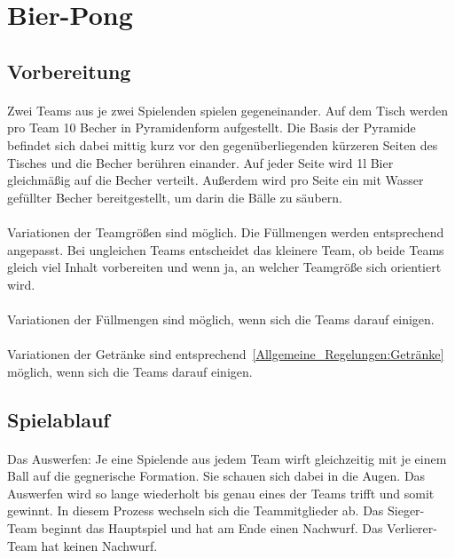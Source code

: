 \section{Bier-Pong}
\subsection{Vorbereitung}
\paragraph{}
Zwei Teams aus je zwei Spielenden spielen gegeneinander.
Auf dem Tisch werden pro Team 10 Becher in Pyramidenform aufgestellt.
Die Basis der Pyramide befindet sich dabei mittig kurz vor den gegenüberliegenden kürzeren Seiten des Tisches und die Becher berühren einander.
Auf jeder Seite wird 1l Bier gleichmäßig auf die Becher verteilt.
Außerdem wird pro Seite ein mit Wasser gefüllter Becher bereitgestellt, um darin die Bälle zu säubern.

\paragraph{}
Variationen der Teamgrößen sind möglich.
Die Füllmengen werden entsprechend angepasst.
Bei ungleichen Teams entscheidet das kleinere Team, ob beide Teams gleich viel Inhalt vorbereiten und wenn ja, an welcher Teamgröße sich orientiert wird.

\paragraph{}
Variationen der Füllmengen sind möglich, wenn sich die Teams darauf einigen.

\paragraph{}
Variationen der Getränke sind entsprechend~\ref{Allgemeine_Regelungen:Getränke} möglich, wenn sich die Teams darauf einigen.

\subsection{Spielablauf}\label{Bier-Pong:Spielablauf}
\paragraph{}
Das Auswerfen: Je eine Spielende aus jedem Team wirft gleichzeitig mit je einem Ball auf die gegnerische Formation.
Sie schauen sich dabei in die Augen. Das Auswerfen wird so lange wiederholt bis genau eines der Teams trifft und somit gewinnt.
In diesem Prozess wechseln sich die Teammitglieder ab.
Das Sieger-Team beginnt das Hauptspiel und hat am Ende einen Nachwurf.
Das Verlierer-Team hat keinen Nachwurf.

